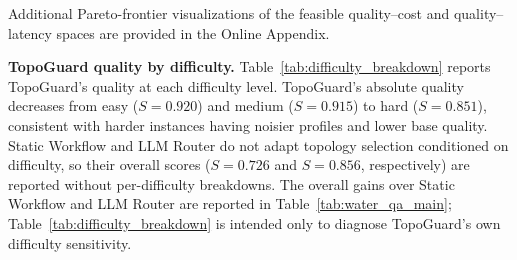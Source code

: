\documentclass[acmsmall,review,anonymous]{acmart}
\begin{document}
Additional Pareto-frontier visualizations of the feasible quality--cost and quality--latency spaces are provided in the Online Appendix.

\begin{table}[t]
\centering
\caption{Closed-loop topology orchestration results on Water QA. All methods are evaluated on the same feasible held-out contexts after cost--latency filtering. Candidate-pool methods use the same profile-derived feasible pool. Best-Quality selects the candidate with the highest estimated quality $S$ from this pool and represents the quality-maximizing operating point achievable through profile-based selection without a utility trade-off. AFlow-Style is a fixed offline-search proxy, not a full reproduction of \cite{zhang2024aflow}.}
\label{tab:water_qa_main}
\end{table}

\textbf{TopoGuard quality by difficulty.} Table~\ref{tab:difficulty_breakdown} reports TopoGuard's quality at each difficulty level. TopoGuard's absolute quality decreases from easy ($S=0.920$) and medium ($S=0.915$) to hard ($S=0.851$), consistent with harder instances having noisier profiles and lower base quality. Static Workflow and LLM Router do not adapt topology selection conditioned on difficulty, so their overall scores ($S=0.726$ and $S=0.856$, respectively) are reported without per-difficulty breakdowns. The overall gains over Static Workflow and LLM Router are reported in Table~\ref{tab:water_qa_main}; Table~\ref{tab:difficulty_breakdown} is intended only to diagnose TopoGuard's own difficulty sensitivity.
\end{document}
